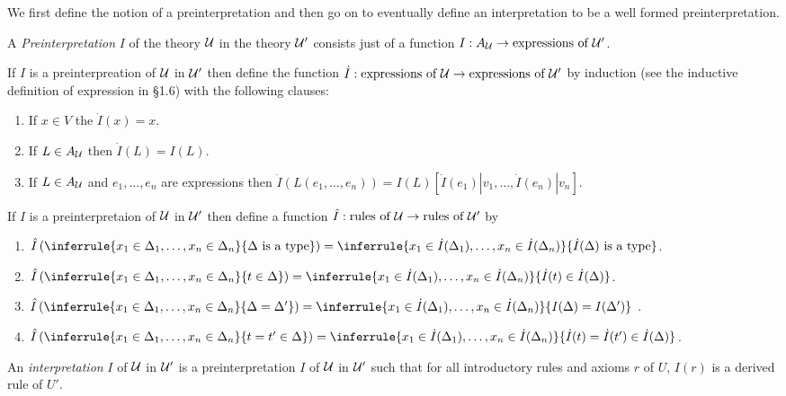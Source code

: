 We first define the notion of a preinterpretation and then go on to eventually define an interpretation to be a well formed preinterpretation.

\begin{definition}
  A \emph{Preinterpretation} $I$ of the theory $\mathcal{U}$ in the theory $\mathcal{U}'$ consists just of a function $I:A_{\mathcal{U}}\to\text{expressions of }\mathcal{U}'$.

  If $I$ is a preinterpreation of $\mathcal{U}$ in $\mathcal{U}'$ then define the function $\dot I : \text{expressions of }\mathcal{U}\to\text{expressions of }\mathcal{U}'$ by induction (see the inductive definition of expression in \S 1.6) with the following clauses:
  \begin{enumerate}
    \item If $x\in V$ the $\dot I(x) = x$.
    \item If $L\in A_{\mathcal{U}}$ then $\dot I(L) = I(L)$.
    \item If $L\in A_{\mathcal{U}}$ and $e_1,\ldots,e_n$ are expressions then $\dot I(L(e_1,\ldots,e_n))=I(L)[\dot I(e_1) | v_1,\ldots,\dot I(e_n)|v_n]$.
  \end{enumerate}

  If $I$ is a preinterpretaion of $\mathcal{U}$ in $\mathcal{U}'$ then define a function $\hat I: \text{rules of }\mathcal{U}\to\text{rules of }\mathcal{U}'$ by

  \begin{enumerate}
    \item $\hat I\left(\inferrule{x_1\in\Delta_1,\ldots,x_n\in\Delta_n}{\Delta\isatype}\right) = \inferrule{x_1\in\dot I(\Delta_1),\ldots,x_n\in\dot I(\Delta_n)}{\dot I(\Delta)\isatype}$.

    \item $\hat I\left(\inferrule{x_1\in\Delta_1,\ldots,x_n\in\Delta_n}{t\in\Delta}\right) = \inferrule{x_1\in\dot I(\Delta_1),\ldots,x_n\in\dot I(\Delta_n)}{\dot I(t)\in\dot I(\Delta)}$.

    \item $\hat I\left(\inferrule{x_1\in\Delta_1,\ldots,x_n\in\Delta_n}{\Delta=\Delta'}\right) = \inferrule{x_1\in\dot I(\Delta_1),\ldots,x_n\in\dot I(\Delta_n)}{I(\Delta)=I(\Delta')}$ .

    \item $\hat I\left(\inferrule{x_1\in\Delta_1,\ldots,x_n\in\Delta_n}{t=t'\in\Delta}\right) = \inferrule{x_1\in\dot I(\Delta_1),\ldots,x_n\in\dot I(\Delta_n)}{\dot I(t) = \dot I(t')\in\dot I(\Delta)}$.
  \end{enumerate}

  An \emph{interpretation} $I$ of $\mathcal{U}$ in $\mathcal{U}'$ is a preinterpretation $I$ of $\mathcal{U}$ in $\mathcal{U}'$ such that for all introductory rules and axioms $r$ of $U$, $I(r)$ is a derived rule of $U'$.

\end{definition}

